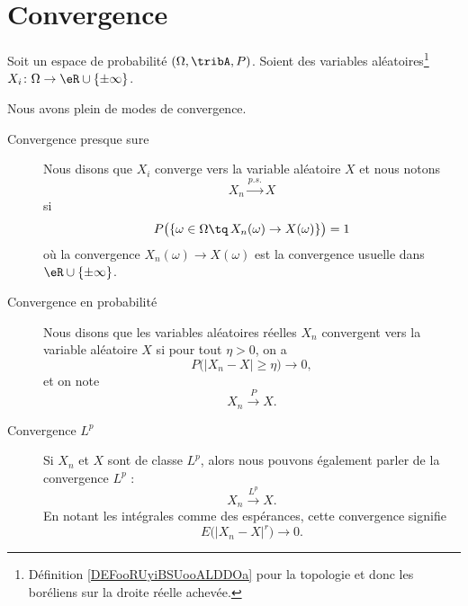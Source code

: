 \section{Convergence}


\begin{definition}      \label{DEFooZKLFooZkKuMC}
	Soit un espace de probabilité \( (\Omega,\tribA,P)\). Soient des variables aléatoires\footnote{Définition \ref{DEFooRUyiBSUooALDDOa} pour la topologie et donc les boréliens sur la droite réelle achevée.} \( X_i\colon \Omega\to \eR\cup\{ \pm\infty \}\).

	Nous avons plein de modes de convergence.
	\begin{description}
		\item[Convergence presque sure]

		      Nous disons que \( X_i\) converge  vers la variable aléatoire \( X\) et nous notons
		      \begin{equation}
			      X_n\stackrel{p.s.}{\longrightarrow}X
		      \end{equation}
		      si
		      \begin{equation}
			      P\big( \{ \omega\in\Omega\tq\,X_n(\omega)\to X(\omega) \} \big)=1
		      \end{equation}
		      où la convergence \( X_n(\omega)\to X(\omega)\) est la convergence usuelle dans \( \eR\cup\{ \pm\infty \}\).
		\item[Convergence en probabilité]
		      Nous disons que les variables aléatoires réelles \( X_n\) convergent  vers la variable aléatoire \( X\) si pour tout \( \eta>0\), on a
		      \begin{equation}
			      P\big( | X_n-X |\geq \eta \big)\to 0,
		      \end{equation}
		      et on note
		      \begin{equation}
			      X_n\stackrel{P}{\longrightarrow}X.
		      \end{equation}

		\item[Convergence \( L^p\)]
		      Si \( X_n\) et \( X\) sont de classe \( L^p\), alors nous pouvons également parler de la convergence \( L^p\) :
		      \begin{equation}
			      X_n\stackrel{ L^p}{\longrightarrow} X.
		      \end{equation}
		      En notant les intégrales comme des espérances, cette convergence signifie
		      \begin{equation}
			      E\big( | X_n-X |^r \big)\to 0.
		      \end{equation}


\end{description}
\end{definition}
